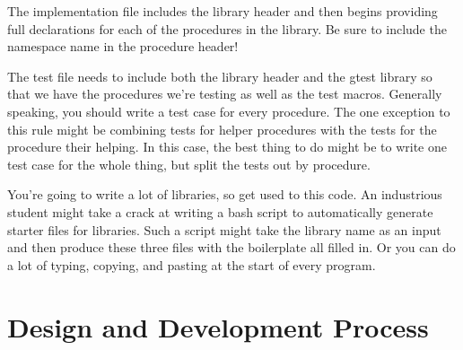 \documentclass[]{tufte-handout}
\begin{document}
The implementation file includes the library header and then begins providing full declarations for each of the procedures in the library. Be sure to include the namespace name in the procedure header!

The test file needs to include both the library header and the gtest library so that we have the procedures we're testing as well as the test macros. Generally speaking, you should write a test case for every procedure. The one exception to this rule might be combining tests for helper procedures with the tests for the procedure their helping.  In this case, the best thing to do might be to write one test case for the whole thing, but split the tests out by procedure.

You're going to write a lot of libraries, so get used to this code. An industrious student might take a crack at writing a bash script to automatically generate starter files for libraries. Such a script might take the library name as an input and then produce these three files with the boilerplate all filled in. Or you can do a lot of typing, copying, and pasting at the start of every program.

\section{Design and Development Process}
\end{document}
